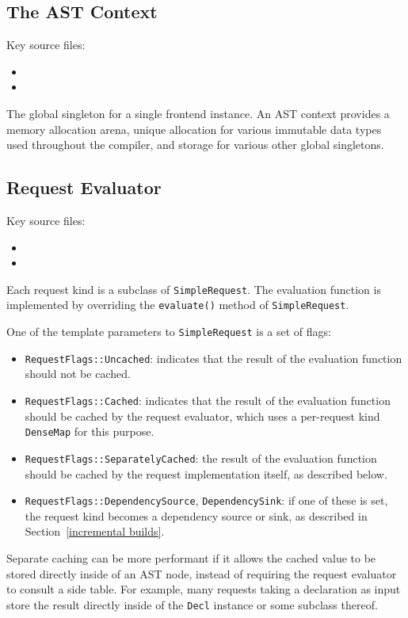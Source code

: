 \documentclass[../generics]{subfiles}
\begin{document}
\subsection*{The AST Context}
Key source files:
\begin{itemize}
\item {}
\item {}
\end{itemize}

The global singleton for a single frontend instance. An AST context provides a memory allocation arena, unique allocation for various immutable data types used throughout the compiler, and storage for various other global singletons.

\subsection*{Request Evaluator}
Key source files:
\begin{itemize}
\item {}
\item {}
\end{itemize}
Each request kind is a subclass of \texttt{SimpleRequest}. The evaluation function is implemented by overriding the \texttt{evaluate()} method of \texttt{SimpleRequest}.

One of the template parameters to \texttt{SimpleRequest} is a set of flags:
\begin{itemize}
\item \texttt{RequestFlags::Uncached}: indicates that the result of the evaluation function should not be cached.
\item \texttt{RequestFlags::Cached}: indicates that the result of the evaluation function should be cached by the request evaluator, which uses a per-request kind \texttt{DenseMap} for this purpose.
\item \texttt{RequestFlags::SeparatelyCached}: the result of the evaluation function should be cached by the request implementation itself, as described below.
\item \texttt{RequestFlags::DependencySource}, \texttt{DependencySink}: if one of these is set, the request kind becomes a dependency source or sink, as described in Section~\ref{incremental builds}.
\end{itemize}
Separate caching can be more performant if it allows the cached value to be stored directly inside of an AST node, instead of requiring the request evaluator to consult a side table. For example, many requests taking a declaration as input store the result directly inside of the \texttt{Decl} instance or some subclass thereof.
\end{document}
